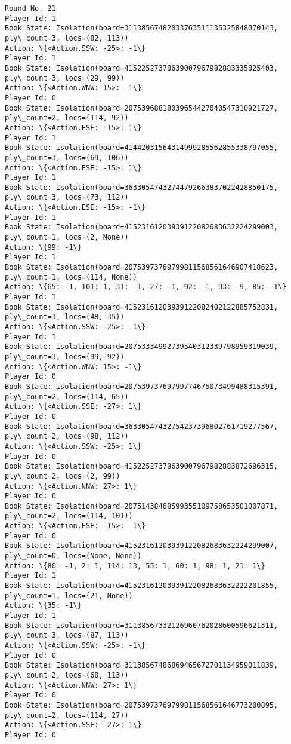 \documentclass[11pt]{article}
\begin{document}
\begin{Verbatim}[commandchars=\\\{\}]
Round No. 21
Player Id: 1
Book State: Isolation(board=31138567482033763511135325848070143, ply\_count=3, locs=(82, 113))
Action: \{<Action.SSW: -25>: -1\}
Player Id: 1
Book State: Isolation(board=41522527378639007967982883335825403, ply\_count=3, locs=(29, 99))
Action: \{<Action.WNW: 15>: -1\}
Player Id: 0
Book State: Isolation(board=20753968818039654427040547310921727, ply\_count=2, locs=(114, 92))
Action: \{<Action.ESE: -15>: 1\}
Player Id: 1
Book State: Isolation(board=41442031564314999285562855338797055, ply\_count=3, locs=(69, 106))
Action: \{<Action.ESE: -15>: 1\}
Player Id: 1
Book State: Isolation(board=36330547432744792663837022428850175, ply\_count=3, locs=(73, 112))
Action: \{<Action.ESE: -15>: -1\}
Player Id: 1
Book State: Isolation(board=41523161203939122082683632224299003, ply\_count=1, locs=(2, None))
Action: \{99: -1\}
Player Id: 1
Book State: Isolation(board=20753973769799811568561646907418623, ply\_count=1, locs=(114, None))
Action: \{65: -1, 101: 1, 31: -1, 27: -1, 92: -1, 93: -9, 85: -1\}
Player Id: 1
Book State: Isolation(board=41523161203939122082402122885752831, ply\_count=3, locs=(48, 35))
Action: \{<Action.SSW: -25>: -1\}
Player Id: 1
Book State: Isolation(board=20753334992739540312339798959319039, ply\_count=3, locs=(99, 92))
Action: \{<Action.WNW: 15>: -1\}
Player Id: 0
Book State: Isolation(board=20753973769799774675073499488315391, ply\_count=2, locs=(114, 65))
Action: \{<Action.SSE: -27>: 1\}
Player Id: 0
Book State: Isolation(board=36330547432754237396802761719277567, ply\_count=2, locs=(98, 112))
Action: \{<Action.SSW: -25>: 1\}
Player Id: 0
Book State: Isolation(board=41522527378639007967982883872696315, ply\_count=2, locs=(2, 99))
Action: \{<Action.NNW: 27>: 1\}
Player Id: 0
Book State: Isolation(board=20751438468599355109758653501007871, ply\_count=2, locs=(114, 101))
Action: \{<Action.ESE: -15>: -1\}
Player Id: 0
Book State: Isolation(board=41523161203939122082683632224299007, ply\_count=0, locs=(None, None))
Action: \{80: -1, 2: 1, 114: 13, 55: 1, 60: 1, 98: 1, 21: 1\}
Player Id: 1
Book State: Isolation(board=41523161203939122082683632222201855, ply\_count=1, locs=(21, None))
Action: \{35: -1\}
Player Id: 1
Book State: Isolation(board=31138567332126960762028600596621311, ply\_count=3, locs=(87, 113))
Action: \{<Action.SSW: -25>: -1\}
Player Id: 0
Book State: Isolation(board=31138567486869465672701134959011839, ply\_count=2, locs=(60, 113))
Action: \{<Action.NNW: 27>: 1\}
Player Id: 0
Book State: Isolation(board=20753973769799811568561646773200895, ply\_count=2, locs=(114, 27))
Action: \{<Action.SSE: -27>: 1\}
Player Id: 0

\end{Verbatim}
\end{document}
